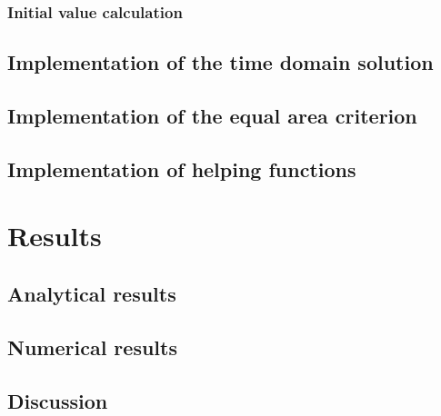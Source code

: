 \subsection{Initial value calculation}

\section{Implementation of the time domain solution}
\label{sec:tds}

\section{Implementation of the equal area criterion}


\section{Implementation of helping functions}


\chapter{Results}
\label{chap:results}


\section{Analytical results}

\section{Numerical results}

\section{Discussion}
\label{sec:discussion}

